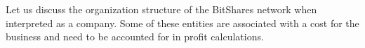Let us discuss the organization structure of the BitShares network when
interpreted as a company. Some of these entities are associated with a cost for
the business and need to be accounted for in profit calculations.
